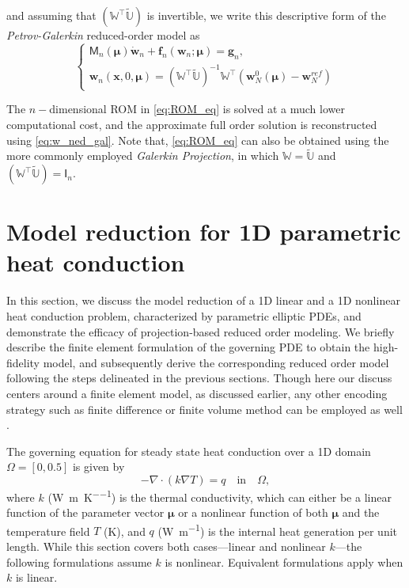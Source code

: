 \documentclass[11pt]{article}
\renewcommand{\vec}[1]{\mathbf{#1}}
\newcommand{\mat}[1]{\mathsf{#1}}
\begin{document}
and assuming that $(\mathbb{W}^\top \widetilde{\mathbb{U}})$ is invertible, we write this {descriptive form} of the \textit{Petrov-Galerkin} reduced-order model as \cite{stanford_cme345}
\begin{equation}
\left\{
\begin{array}{l}
\mat{M}_n(\boldsymbol{\mu}) \dot{\vec{w}}_n + \vec{f}_n(\vec{w}_n; \boldsymbol{\mu}) = \vec{g}_n,\\
\vec{w}_n(\vec{x},0, \boldsymbol{\mu}) = (\mathbb{W}^\top \widetilde{\mathbb{U}})^{-1}\mathbb{W}^\top (\vec{w}_N^0(\boldsymbol{\mu})-\vec{w}^{ref}_N)
\end{array}
\right.
\label{eq:ROM_eq}
\end{equation}


The $n-$dimensional ROM in \cref{eq:ROM_eq} is solved at a much lower computational cost, and the approximate full order solution is reconstructed using \cref{eq:w_ned_gal}.
Note that, \cref{eq:ROM_eq} can also be obtained using the more commonly employed \textit{Galerkin Projection}, in which  $\mathbb{W}=\widetilde{\mathbb{U}}$ and  $(\mathbb{W}^\top \widetilde{\mathbb{U}})=\mat{I}_{n}$.















\section{Model reduction for 1D parametric heat conduction}
\label{sec:ROM_example}

In this section, we discuss the model reduction of a 1D linear and a 1D nonlinear heat conduction problem, characterized by parametric elliptic PDEs, and demonstrate the efficacy of projection-based reduced order modeling.
We briefly describe the finite element formulation of the governing PDE to obtain the high-fidelity model, and subsequently derive the corresponding reduced order model following the steps delineated in the previous sections.
Though here our discuss centers around a finite element model, as discussed earlier, any other encoding strategy such as finite difference or finite volume method can be employed as well \cite{farhat2020computational}.


The governing equation for steady state heat conduction over a 1D domain $\Omega = [0,0.5]$ is given by
\begin{equation}
-\nabla \cdot (k \nabla T) = q \quad \text{in} \quad \Omega,
\label{eq:heat_pde}
\end{equation}
where $k$ ({\unit{\watt\per\meter\per\kelvin}}) is the thermal conductivity, which can either be a linear function of the parameter vector $\boldsymbol{\mu}$ or a nonlinear function of both $\boldsymbol{\mu}$ and the temperature field $T$ ({\unit{\kelvin}}), and \( q \) (\unit{\watt\per\meter}) is the internal heat generation per unit length.
While this section covers both cases—linear and nonlinear \( k \)—the following formulations assume $k$ is nonlinear.
Equivalent formulations apply when \( k \) is linear.
\end{document}
